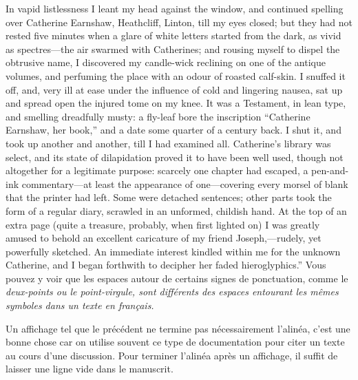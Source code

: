 \begindisplay
%
%
\smallsize%
\noindent
{}%
In vapid listlessness I leant my head against the window, and
continued spelling over Catherine Earnshaw, Heathcliff, Linton, till
my eyes closed; but they had not rested five minutes when a glare of
white letters started from the dark, as vivid as spectres---the air
swarmed with Catherines; and rousing myself to dispel the obtrusive
name, I discovered my candle-wick reclining on one of the antique
volumes, and perfuming the place with an odour of roasted calf-skin.
I snuffed it off, and, very ill at ease under the influence of cold
and lingering nausea, sat up and spread open the injured tome on my
knee.  It was a Testament, in lean type, and smelling dreadfully
musty: a fly-leaf bore the inscription ``Catherine Earnshaw, her
book,'' and a date some quarter of a century back.  I shut it, and
took up another and another, till I had examined all.  Catherine's
library was select, and its state of dilapidation proved it to have
been well used, though not altogether for a legitimate purpose:
scarcely one chapter had escaped, a pen-and-ink commentary---at least
the appearance of one---covering every morsel of blank that the
printer had left.  Some were detached sentences; other parts took the
form of a regular diary, scrawled in an unformed, childish hand.  At
the top of an extra page (quite a treasure, probably, when first
lighted on) I was greatly amused to behold an excellent caricature of
my friend Joseph,---rudely, yet powerfully sketched. An immediate
interest kindled within me for the unknown Catherine, and I began
forthwith to decipher her faded hieroglyphics.''
\enddisplay
Vous pouvez y voir que les espaces autour de certains signes de
ponctuation, comme le \em{deux-points} ou le \em{point-virgule}, sont
différents des espaces entourant les mêmes symboles dans un texte en
français.

Un affichage tel que le précédent ne termine pas nécessairement
l'alinéa, c'est une bonne chose car on utilise souvent ce type de
documentation pour citer un texte au cours d'une discussion. Pour
terminer l'alinéa après un affichage, il suffit de laisser une ligne
vide dans le manuscrit.

